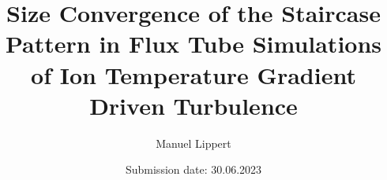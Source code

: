 \titlehead{
    \centering
    \texttt{[image: Uni\_Logo\_white\_black.png]}
}

\subject{\normalfont Bachelor Thesis}
\title{Size Convergence of the \boldmath{$\exb$} Staircase Pattern in Flux Tube Simulations of Ion Temperature Gradient Driven Turbulence}
\author{Manuel Lippert}
\date{Submission date: 30.06.2023}
\publishers{\textbf{Physics Department at the University of Bayreuth}\\
\vspace*{2em}
Supervisors:\\
Prof.\,Arthur\,G.\,Peeters\\
Dr.\,Florian\,Rath
}
